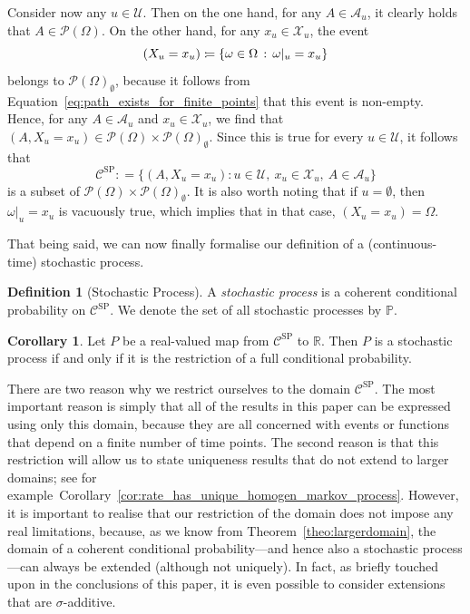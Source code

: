 \documentclass[10pt,a4paper]{paper}
\theoremstyle{definition}
\newtheorem{corollary}[theorem]{Corollary}
\newtheorem{definition}{Definition}
\newcommand{\reals}{\mathbb{R}}
\newcommand{\states}{\mathcal{X}}
\newcommand{\paths}{\Omega}
\newcommand{\power}{\mathcal{P}(\paths)}
\newcommand{\nonemptypower}{\power_{\emptyset}}
\newcommand{\processes}{\mathbb{P}}
\newcommand{\coloneqq}{:\!=}
\begin{document}
Consider now any $u\in\mathcal{U}$. Then on the one hand, for any $A\in\mathcal{A}_u$, it clearly holds that $A\in\power$. On the other hand, for any $x_u\in\states_u$, the event
\begin{equation*}
(X_u=x_u) \coloneqq \{\omega\in\Omega\,:\,\omega\vert_u=x_u\}
\vspace{4pt}
\end{equation*}
belongs to $\nonemptypower$, because it follows from Equation~\eqref{eq:path_exists_for_finite_points} that this event is non-empty. 
Hence, for any $A\in\mathcal{A}_u$ and $x_u\in\states_u$, we find that $(A,X_u=x_u)\in\power\times\nonemptypower$. Since this is true for every $u\in\mathcal{U}$, it follows that
\begin{equation*}
\mathcal{C}^\mathrm{SP}\coloneqq\big\{
(A,X_u=x_u)
\colon
u\in\mathcal{U},~x_u\in\states_u,~A\in\mathcal{A}_u\big\}
\end{equation*}
is a subset of $\power\times\nonemptypower$. It is also worth noting that if $u=\emptyset$, then $\omega\vert_u=x_u$ is vacuously true, which implies that in that case, $(X_u=x_u)=\Omega$.


That being said, we can now finally formalise our definition of a (continuous-time) stochastic process.

\begin{definition}[Stochastic Process]\label{def:stoch_process}
A \emph{stochastic process} is a coherent conditional probability on $\mathcal{C}^\mathrm{SP}$. We denote the set of all stochastic processes by $\processes$.
\end{definition}


\begin{corollary}\label{corol:processiffrestriction}
Let $P$ be a real-valued map from $\mathcal{C}^\mathrm{SP}$ to $\reals$. Then $P$ is a stochastic process if and only if it is the restriction of a full conditional probability.
\end{corollary}

There are two reason why we restrict ourselves to the domain $\mathcal{C}^\mathrm{SP}$. The most important reason is simply that all of the results in this paper can be expressed using only this domain, because they are all concerned with events or functions that depend on a finite number of time points. The second reason is that this restriction will allow us to state  uniqueness results that do not extend to larger domains; see for example~Corollary~\ref{cor:rate_has_unique_homogen_markov_process}. However, it is important to realise that our restriction of the domain does not impose any real limitations, because, as we know from Theorem~\ref{theo:largerdomain}, the domain of a coherent conditional probability---and hence also a stochastic process---can always be extended (although not uniquely). In fact, as briefly touched upon in the conclusions of this paper, it is even possible to consider extensions that are $\sigma$-additive.
\end{document}
